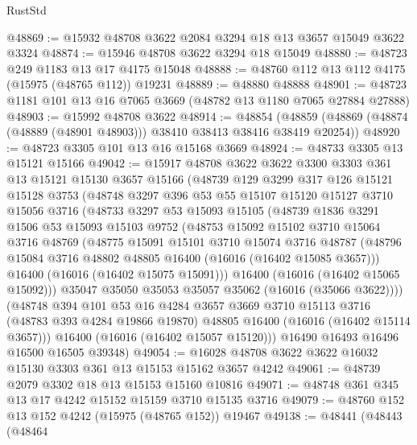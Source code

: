 \begin{lexlean}{RustStd}
\begin{coremodule}
@48869 := @15932 @48708 @3622 @2084 @3294 @18 @13 @3657 @15049 @3622 @3324
@48874 := @15946 @48708 @3622 @3294 @18 @15049
@48880 := @48723 @249 @1183 @13 @17 @4175 @15048
@48888 := @48760 @112 @13 @112 @4175 (@15975 (@48765 @112)) @19231
@48889 := @48880 @48888
@48901 := @48723 @1181 @101 @13 @16 @7065 @3669 (@48782 @13 @1180 @7065 @27884 @27888)
@48903 := @15992 @48708 @3622
@48914 := @48854
    (@48859 (@48869 (@48874 (@48889 (@48901 @48903))) @38410 @38413 @38416 @38419 @20254))
@48920 := @48723 @3305 @101 @13 @16 @15168 @3669
@48924 := @48733 @3305 @13 @15121 @15166
@49042 := @15917
    @48708
    @3622
    @3622
    @3300
    @3303
    @361
    @13
    @15121
    @15130
    @3657
    @15166
    (@48739
      @129
      @3299
      @317
      @126
      @15121
      @15128
      @3753
      (@48748
        @3297
        @396
        @53
        @55
        @15107
        @15120
        @15127
        @3710
        @15056
        @3716
        (@48733
          @3297
          @53
          @15093
          @15105
          (@48739
            @1836
            @3291
            @1506
            @53
            @15093
            @15103
            @9752
            (@48753
              @15092
              @15102
              @3710
              @15064
              @3716
              @48769
              (@48775
                @15091
                @15101
                @3710
                @15074
                @3716
                @48787
                (@48796 @15084 @3716 @48802 @48805 @16400 (@16016 (@16402 @15085 @3657)))
                @16400
                (@16016 (@16402 @15075 @15091)))
              @16400
              (@16016 (@16402 @15065 @15092)))
            @35047
            @35050
            @35053
            @35057
            @35062
            (@16016 (@35066 @3622))))
        (@48748
          @394
          @101
          @53
          @16
          @4284
          @3657
          @3669
          @3710
          @15113
          @3716
          (@48783 @393 @4284 @19866 @19870)
          @48805
          @16400
          (@16016 (@16402 @15114 @3657)))
        @16400
        (@16016 (@16402 @15057 @15120)))
      @16490
      @16493
      @16496
      @16500
      @16505
      @39348)
@49054 := @16028 @48708 @3622 @3622 @16032 @15130 @3303 @361 @13 @15153 @15162 @3657 @4242
@49061 := @48739 @2079 @3302 @18 @13 @15153 @15160 @10816
@49071 := @48748 @361 @345 @13 @17 @4242 @15152 @15159 @3710 @15135 @3716
@49079 := @48760 @152 @13 @152 @4242 (@15975 (@48765 @152)) @19467
@49138 := @48441
    (@48443
      (@48464

\end{coremodule}
\end{lexlean}
